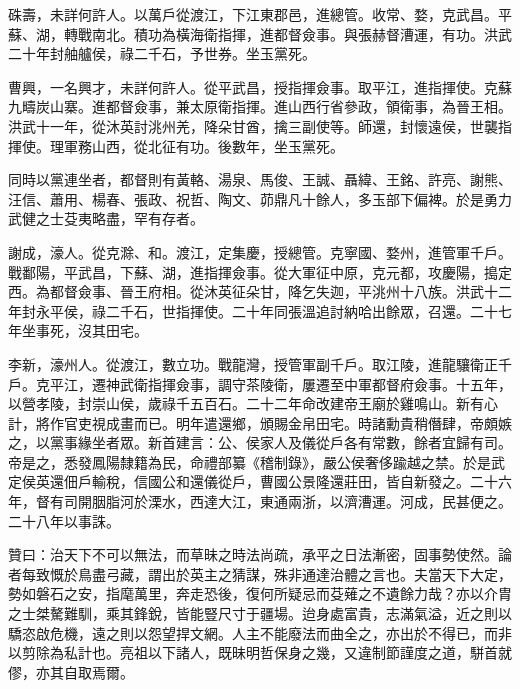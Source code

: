\begin{pinyinscope}
硃壽，未詳何許人。以萬戶從渡江，下江東郡邑，進總管。收常、婺，克武昌。平蘇、湖，轉戰南北。積功為橫海衛指揮，進都督僉事。與張赫督漕運，有功。洪武二十年封舳艫侯，祿二千石，予世券。坐玉黨死。

曹興，一名興才，未詳何許人。從平武昌，授指揮僉事。取平江，進指揮使。克蘇九疇炭山寨。進都督僉事，兼太原衛指揮。進山西行省參政，領衛事，為晉王相。洪武十一年，從沐英討洮州羌，降朵甘酋，擒三副使等。師還，封懷遠侯，世襲指揮使。理軍務山西，從北征有功。後數年，坐玉黨死。

同時以黨連坐者，都督則有黃輅、湯泉、馬俊、王誠、聶緯、王銘、許亮、謝熊、汪信、蕭用、楊春、張政、祝哲、陶文、茆鼎凡十餘人，多玉部下偏裨。於是勇力武健之士芟夷略盡，罕有存者。

謝成，濠人。從克滁、和。渡江，定集慶，授總管。克寧國、婺州，進管軍千戶。戰鄱陽，平武昌，下蘇、湖，進指揮僉事。從大軍征中原，克元都，攻慶陽，搗定西。為都督僉事、晉王府相。從沐英征朵甘，降乞失迦，平洮州十八族。洪武十二年封永平侯，祿二千石，世指揮使。二十年同張溫追討納哈出餘眾，召還。二十七年坐事死，沒其田宅。

李新，濠州人。從渡江，數立功。戰龍灣，授管軍副千戶。取江陵，進龍驤衛正千戶。克平江，遷神武衛指揮僉事，調守茶陵衛，屢遷至中軍都督府僉事。十五年，以營孝陵，封崇山侯，歲祿千五百石。二十二年命改建帝王廟於雞鳴山。新有心計，將作官吏視成畫而已。明年遣還鄉，頒賜金帛田宅。時諸勳貴稍僭肆，帝頗嫉之，以黨事緣坐者眾。新首建言：公、侯家人及儀從戶各有常數，餘者宜歸有司。帝是之，悉發鳳陽隸籍為民，命禮部纂《稽制錄》，嚴公侯奢侈踰越之禁。於是武定侯英還佃戶輸稅，信國公和還儀從戶，曹國公景隆還莊田，皆自新發之。二十六年，督有司開胭脂河於溧水，西達大江，東通兩浙，以濟漕運。河成，民甚便之。二十八年以事誅。

贊曰：治天下不可以無法，而草昧之時法尚疏，承平之日法漸密，固事勢使然。論者每致慨於鳥盡弓藏，謂出於英主之猜謀，殊非通達治體之言也。夫當天下大定，勢如磐石之安，指麾萬里，奔走恐後，復何所疑忌而芟薙之不遺餘力哉？亦以介胄之士桀驁難馴，乘其鋒銳，皆能豎尺寸于疆場。迨身處富貴，志滿氣溢，近之則以驕恣啟危機，遠之則以怨望捍文網。人主不能廢法而曲全之，亦出於不得已，而非以剪除為私計也。亮祖以下諸人，既昧明哲保身之幾，又違制節謹度之道，駢首就僇，亦其自取焉爾。


\end{pinyinscope}
